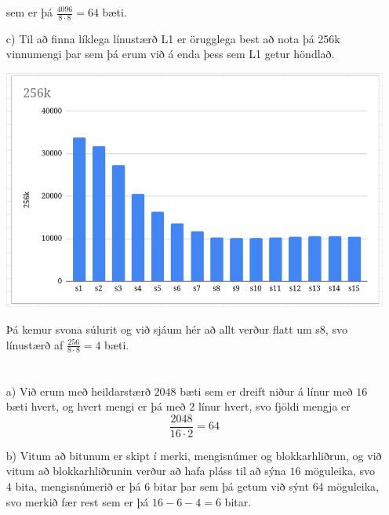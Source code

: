 \documentclass{article}
\begin{document}
\begin{itemize}
			sem er þá $\frac{4096}{8\cdot8} = 64$ bæti.
		\item[c)] Til að finna líklega línustærð L1 er örugglega best að 
			nota þá 256k vinnumengi þar sem þá erum við á enda þess sem L1 
			getur höndlað.
			\begin{center}
				\includegraphics[scale=0.35]{256.png}
			\end{center}
			Þá kemur svona súlurit og við sjáum hér að allt verður flatt 
			um s8, svo línustærð af $\frac{256}{8\cdot8} = 4$ bæti.
	\end{itemize}

	\section{}
	\begin{itemize}
		\item[a)] Við erum með heildarstærð $2048$ bæti sem er dreift 
			niður á línur með $16$ bæti hvert, og hvert mengi er þá með 
			$2$ línur hvert, svo fjöldi mengja er
			\begin{equation}
				\frac{2048}{16\cdot2} = 64
				\label{eq:gamer4}
			\end{equation}
		\item[b)] Vitum að bitunum er skipt í merki, mengisnúmer og 
			blokkarhliðrun, og við vitum að blokkarhliðrunin verður að hafa 
			pláss til að sýna $16$ möguleika, svo $4$ bita, mengisnúmerið 
			er þá $6$ bitar þar sem þá getum við sýnt $64$ möguleika, svo 
			merkið fær rest sem er þá $16 - 6 - 4 = 6$ bitar.
	\end{itemize}
\end{document}
